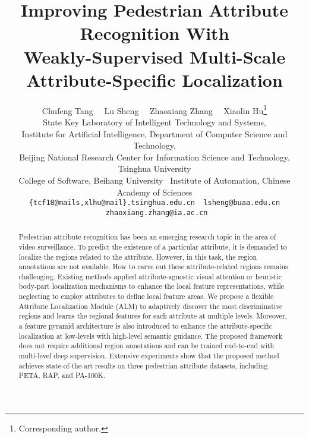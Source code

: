\documentclass[10pt,twocolumn,letterpaper]{article}
\begin{document}
\title{Improving Pedestrian Attribute Recognition With \\ Weakly-Supervised Multi-Scale Attribute-Specific Localization}

\author{Chufeng Tang \ \ Lu Sheng \ \ Zhaoxiang Zhang \ \ Xiaolin Hu\thanks{Corresponding author.} \\
State Key Laboratory of Intelligent Technology and Systems, \\
Institute for Artificial Intelligence, Department of Computer Science and Technology, \\
Beijing National Research Center for Information Science and Technology, Tsinghua University \\
College of Software, Beihang University \
Institute of Automation, Chinese Academy of Sciences \\
{\tt\small \{tcf18@mails,xlhu@mail\}.tsinghua.edu.cn \ lsheng@buaa.edu.cn \ zhaoxiang.zhang@ia.ac.cn}
}

\maketitle
\ificcvfinal\thispagestyle{empty}\fi


\begin{abstract}
  Pedestrian attribute recognition has been an emerging research topic in the area of video surveillance.
To predict the existence of a particular attribute, it is demanded to localize the regions related to the attribute. However, in this task, the region annotations are not available. How to carve out these attribute-related regions remains challenging.
Existing methods applied attribute-agnostic visual attention or heuristic body-part localization mechanisms to enhance the local feature representations, while neglecting to employ attributes to define local feature areas.
We propose a flexible Attribute Localization Module (ALM) to adaptively discover the most discriminative regions and learns the regional features for each attribute at multiple levels.
Moreover, a feature pyramid architecture is also introduced to enhance the attribute-specific localization at low-levels with high-level semantic guidance.
The proposed framework does not require additional region annotations and can be trained end-to-end with multi-level deep supervision.
Extensive experiments show that the proposed method achieves state-of-the-art results on three pedestrian attribute datasets, including PETA, RAP, and PA-100K.
\end{abstract}
\end{document}
